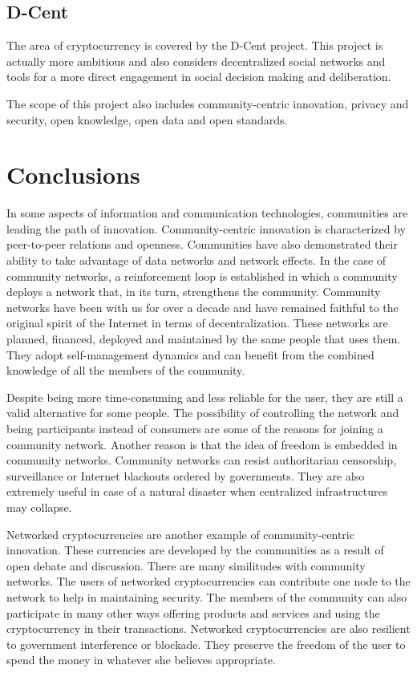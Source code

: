 \documentclass[journal]{IEEEtran}
\begin{document}
\subsection{D-Cent}
The area of cryptocurrency is covered by the D-Cent project.
This project is actually more ambitious and also considers decentralized social networks and tools for a more direct engagement in social decision making and deliberation.

The scope of this project also includes community-centric innovation, privacy and security, open knowledge, open data and open standards.

\section{Conclusions}
\label{sec:conclusion}

In some aspects of information and communication technologies, communities are  leading the path of innovation.
Community-centric innovation is characterized by peer-to-peer relations and openness.
Communities have also demonstrated their ability to take advantage of data networks and network effects.
In the case of community networks, a reinforcement loop is established in which a community deploys a network that, in its turn, strengthens the community.
Community networks have been with us for over a decade and have remained faithful to the original spirit of the Internet in terms of decentralization.
These networks are planned, financed, deployed and maintained by the same people that uses them.
They adopt self-management dynamics and can benefit from the combined knowledge of all the members of the community.

Despite being more time-consuming and less reliable for the user, they are still a valid alternative for some people.
The possibility of controlling the network and being participants instead of consumers are some of the reasons for joining a community network.
Another reason is that the idea of freedom is embedded in community networks.
Community networks can resist authoritarian censorship, surveillance or Internet blackouts ordered by governments.
They are also extremely useful in case of a natural disaster when centralized infrastructures may collapse.

Networked cryptocurrencies are another example of community-centric innovation.
These currencies are developed by the communities as a result of open debate and discussion.
There are many similitudes with community networks.
The users of networked cryptocurrencies can contribute one node to the network to help in maintaining security.
The members of the community can also participate in many other ways offering products and services and using the cryptocurrency in their transactions.
Networked cryptocurrencies are also resilient to government interference or blockade.
They preserve the freedom of the user to spend the money in whatever she believes appropriate.
\end{document}
